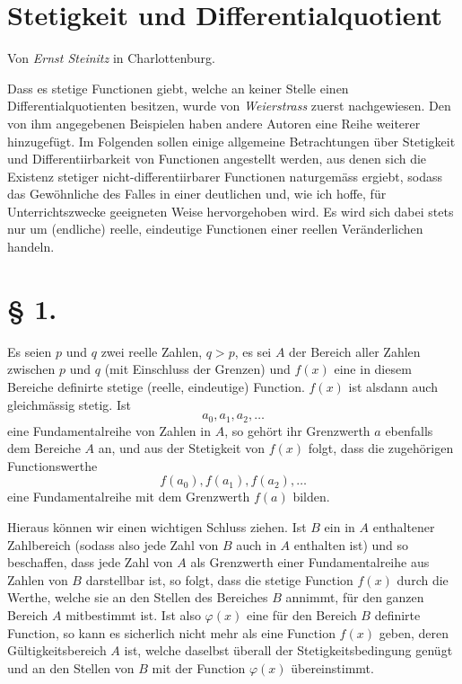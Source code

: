 \documentclass[11pt,a4paper]{article}
\begin{document}
\section*{Stetigkeit und Differentialquotient}
\begin{center}
Von \emph{Ernst Steinitz} in Charlottenburg.
\end{center}

Dass es stetige Functionen giebt, welche an keiner Stelle einen Differentialquotienten besitzen, wurde von \emph{Weierstrass} zuerst nachgewiesen. Den von ihm angegebenen Beispielen haben andere Autoren eine Reihe weiterer hinzugefügt. Im Folgenden sollen einige allgemeine Betrachtungen über Stetigkeit und Differentiirbarkeit von Functionen angestellt werden, aus denen sich die Existenz stetiger nicht-differentiirbarer Functionen naturgemäss ergiebt, sodass das Gewöhnliche des Falles in einer deutlichen und, wie ich hoffe, für Unterrichtszwecke geeigneten Weise hervorgehoben wird. Es wird sich dabei stets nur um (endliche) reelle, eindeutige Functionen einer reellen Veränderlichen handeln.

\section*{§ 1.}

Es seien $p$ und $q$ zwei reelle Zahlen, $q>p$, es sei $A$ der Bereich aller Zahlen zwischen $p$ und $q$ (mit Einschluss der Grenzen) und $f(x)$ eine in diesem Bereiche definirte stetige (reelle, eindeutige) Function. $f(x)$ ist alsdann auch gleichmässig stetig. Ist
\[
 a_0, a_1, a_2, \ldots
\]
eine Fundamentalreihe von Zahlen in $A$, so gehört ihr Grenzwerth $a$ ebenfalls dem Bereiche $A$ an, und aus der Stetigkeit von $f(x)$ folgt, dass die zugehörigen Functionswerthe
\[
 f(a_0), f(a_1), f(a_2), \ldots
\]
eine Fundamentalreihe mit dem Grenzwerth $f(a)$ bilden.

Hieraus können wir einen wichtigen Schluss ziehen. Ist $B$ ein in $A$ enthaltener Zahlbereich (sodass also jede Zahl von $B$ auch in $A$ enthalten ist) und so beschaffen, dass jede Zahl von $A$ als Grenzwerth einer Fundamentalreihe aus Zahlen von $B$ darstellbar ist, so folgt, dass die stetige Function $f(x)$ durch die Werthe, welche sie an den Stellen des Bereiches $B$ annimmt, für den ganzen Bereich $A$ mitbestimmt ist. Ist also $\varphi(x)$ eine für den Bereich $B$ definirte Function, so kann es sicherlich nicht mehr als eine Function $f(x)$ geben, deren Gültigkeitsbereich $A$ ist, welche daselbst überall der Stetigkeitsbedingung genügt und an den Stellen von $B$ mit der Function $\varphi(x)$ übereinstimmt.
\end{document}
